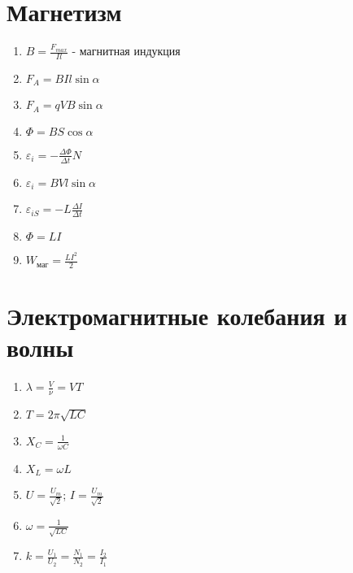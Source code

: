 \documentclass{proc}
\begin{document}
\section{Магнетизм}
\begin{enumerate}
    \item $\displaystyle B = \frac{F_{max}}{Il}$ - магнитная индукция
    \item $\displaystyle F_A=BIl\sin\alpha$
    \item $\displaystyle F_A=qVB\sin\alpha$
    \item $\displaystyle \Phi=BS\cos\alpha$
    \item $\displaystyle \varepsilon_i=-\frac{\Delta\Phi}{\Delta t}N$
    \item $\displaystyle \varepsilon_i=BVl\sin\alpha$
    \item $\displaystyle \varepsilon_{iS}=-L\frac{\Delta I}{\Delta t}$
    \item $\displaystyle \Phi = LI$
    \item $\displaystyle W_{маг}=\frac{LI^2}{2}$
\end{enumerate}


\section{Электромагнитные колебания и волны}
\begin{enumerate}
    \item $\displaystyle \lambda = \frac V\nu=VT$
    \item $\displaystyle T = 2\pi\sqrt{LC}$
    \item $\displaystyle X_C=\frac{1}{\omega C}$
    \item $\displaystyle X_L = \omega L$
    \item $\displaystyle U=\frac{U_m}{\sqrt{2}}$; $\displaystyle I=\frac{U_m}{\sqrt{2}}$
    \item $\displaystyle \omega=\frac{1}{\sqrt{LC}}$
    \item $\displaystyle k=\frac{U_1}{U_2}=\frac{N_1}{N_2}=\frac{I_2}{I_1}$
\end{enumerate}
\end{document}
